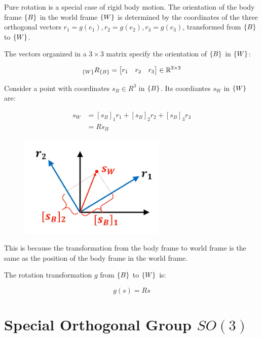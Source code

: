 Pure rotation is a special case of rigid body motion. The orientation of the body frame $\{B\}$ in the world frame $\{W\}$ is determined by the coordinates of the three orthogonal vectors $r_1 = g(e_1), r_2 = g(e_2), r_3 = g(e_3)$, transformed from $\{B\}$ to $\{W\}$.

The vectors organized in a $3\times 3$ matrix specify the orientation of $\{B\}$ in $\{W\}$:

\begin{equation*}
    {}_{\{W\}}R_{\{B\}} = \begin{bmatrix}
        r_1 & r_2 & r_3
    \end{bmatrix} \in \mathbb{R}^{3\times 3}
\end{equation*}

Consider a point with coordinates $s_B\in R^3$ in $\{B\}$. Its coordiantes $s_W$ in $\{W\}$ are:

\begin{equation*}
    \begin{split}
        s_W &= [s_B]_1r_1 + [s_B]_2r_2 + [s_B]_3r_3 \\
        &= Rs_B
    \end{split}
\end{equation*}

\begin{figure}[h]\centering\includegraphics[width=7cm]{img/j_3_2.png}\end{figure}

 This is because the transformation from the body frame to world frame is the same as the position of the body frame in the world frame.

The rotation transformation $g$ from $\{B\}$ to $\{W\}$ is:

\begin{equation*}
    g(s) = Rs
\end{equation*}

\section{Special Orthogonal Group $SO(3)$}

